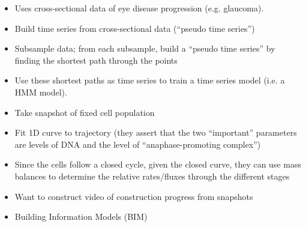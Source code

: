 \documentclass[12pt]{article}
\begin{document}




\begin{itemize}
	\item Uses cross-sectional data of eye disease progression (e.g. glaucoma).
	\item Build time series from cross-sectional data (``pseudo time series'')
	\item Subsample data; from each subsample, build a ``pseudo time series'' by finding the shortest path through the points
	\item Use these shortest paths as time series to train a time series model (i.e. a HMM model).
\end{itemize}

\begin{itemize}
	\item Take snapshot of fixed cell population
	\item Fit 1D curve to trajectory (they assert that the two ``important'' parameters are levels of DNA and the level of ``anaphase-promoting complex'')
	\item Since the cells follow a closed cycle, given the closed curve, they can use mass balances to determine the relative rates/fluxes through the different stages
\end{itemize}













  





\begin{itemize}
	\item Want to construct video of construction progress from snapshots
	\item Building Information Models (BIM) 
\end{itemize}

\end{document}
